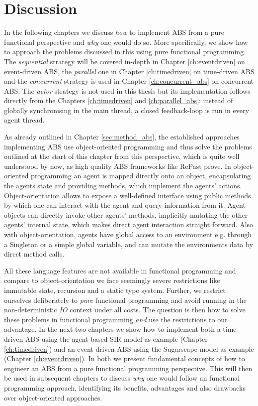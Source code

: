 \section{Discussion}
In the following chapters we discuss \textit{how} to implement ABS from a pure functional perspective and \textit{why} one would do so. More specifically, we show how to approach the problems discussed in this using pure functional programming. The \textit{sequential} strategy will be covered in-depth in Chapter \ref{ch:eventdriven} on event-driven ABS, the \textit{parallel} one in Chapter \ref{ch:timedriven} on time-driven ABS and the \textit{concurrent} strategy is used in Chapter \ref{ch:concurrent_abs} on concurrent ABS. The \textit{actor} strategy is not used in this thesis but its implementation follows directly from the Chapters \ref{ch:timedriven} and \ref{ch:parallel_abs}: instead of globally synchronising in the main thread, a closed feedback-loop is run in every agent thread. 

As already outlined in Chapter \ref{sec:method_abs}, the established approaches implementing ABS use object-oriented programming and thus solve the problems outlined at the start of this chapter from this perspective, which is quite well understood by now, as high quality ABS frameworks like RePast \cite{north_complex_2013} prove. In object-oriented programming an agent is mapped directly onto an object, encapsulating the agents state and providing methods, which implement the agents' actions. Object-orientation allows to expose a well-defined interface using public methods by which one can interact with the agent and query information from it. Agent objects can directly invoke other agents' methods, implicitly mutating the other agents' internal state, which makes direct agent interaction straight forward. Also with object-orientation, agents have global access to an environment e.g. through a Singleton or a simple global variable, and can mutate the environments data by direct method calls.

All these language features are not available in functional programming and compare to object-orientation we face seemingly severe restrictions like immutable state, recursion and a static type system. Further, we restrict ourselves deliberately to \textit{pure} functional programming and avoid running in the non-deterministic \textit{IO} context under all costs. The question is then how to solve these problems in functional programming \textit{and} use the restrictions to our advantage. In the next two chapters we show how to implement both a time-driven ABS  using the agent-based SIR model as example (Chapter \ref{ch:timedriven}) and an event-driven ABS using the Sugarscape model as example (Chapter \ref{ch:eventdriven}). In both we present fundamental concepts of how to engineer an ABS from a pure functional programming perspective. This will then be used in subsequent chapters to discuss \textit{why} one would follow an functional programming approach, identifying its benefits, advantages and also drawbacks over object-oriented approaches. 

